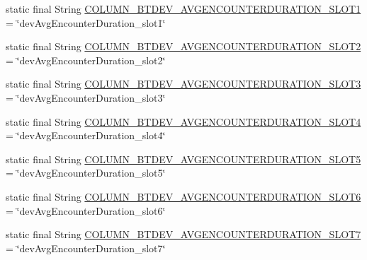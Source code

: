 \begin{DoxyCompactItemize}
\item 
static final String \hyperlink{classcom_1_1copelabs_1_1oiframework_1_1socialproximity_1_1_s_q_lite_helper_a1587f0eed87daf373cf8e595fa3061a0}{C\+O\+L\+U\+M\+N\+\_\+\+B\+T\+D\+E\+V\+\_\+\+A\+V\+G\+E\+N\+C\+O\+U\+N\+T\+E\+R\+D\+U\+R\+A\+T\+I\+O\+N\+\_\+\+S\+L\+O\+T1} = \char`\"{}dev\+Avg\+Encounter\+Duration\+\_\+slot1\char`\"{}
\item 
static final String \hyperlink{classcom_1_1copelabs_1_1oiframework_1_1socialproximity_1_1_s_q_lite_helper_aefeb1d706536288b9e0e606fe4ee6df1}{C\+O\+L\+U\+M\+N\+\_\+\+B\+T\+D\+E\+V\+\_\+\+A\+V\+G\+E\+N\+C\+O\+U\+N\+T\+E\+R\+D\+U\+R\+A\+T\+I\+O\+N\+\_\+\+S\+L\+O\+T2} = \char`\"{}dev\+Avg\+Encounter\+Duration\+\_\+slot2\char`\"{}
\item 
static final String \hyperlink{classcom_1_1copelabs_1_1oiframework_1_1socialproximity_1_1_s_q_lite_helper_a4f1f938f3722be2271d4593b1d8d3ac2}{C\+O\+L\+U\+M\+N\+\_\+\+B\+T\+D\+E\+V\+\_\+\+A\+V\+G\+E\+N\+C\+O\+U\+N\+T\+E\+R\+D\+U\+R\+A\+T\+I\+O\+N\+\_\+\+S\+L\+O\+T3} = \char`\"{}dev\+Avg\+Encounter\+Duration\+\_\+slot3\char`\"{}
\item 
static final String \hyperlink{classcom_1_1copelabs_1_1oiframework_1_1socialproximity_1_1_s_q_lite_helper_aa7f5e3c448045c6ea284cead8ada6280}{C\+O\+L\+U\+M\+N\+\_\+\+B\+T\+D\+E\+V\+\_\+\+A\+V\+G\+E\+N\+C\+O\+U\+N\+T\+E\+R\+D\+U\+R\+A\+T\+I\+O\+N\+\_\+\+S\+L\+O\+T4} = \char`\"{}dev\+Avg\+Encounter\+Duration\+\_\+slot4\char`\"{}
\item 
static final String \hyperlink{classcom_1_1copelabs_1_1oiframework_1_1socialproximity_1_1_s_q_lite_helper_a7d44e66e42425d636c452b9dbddec5db}{C\+O\+L\+U\+M\+N\+\_\+\+B\+T\+D\+E\+V\+\_\+\+A\+V\+G\+E\+N\+C\+O\+U\+N\+T\+E\+R\+D\+U\+R\+A\+T\+I\+O\+N\+\_\+\+S\+L\+O\+T5} = \char`\"{}dev\+Avg\+Encounter\+Duration\+\_\+slot5\char`\"{}
\item 
static final String \hyperlink{classcom_1_1copelabs_1_1oiframework_1_1socialproximity_1_1_s_q_lite_helper_a4c44d6f65c62d53bd276c79208d38348}{C\+O\+L\+U\+M\+N\+\_\+\+B\+T\+D\+E\+V\+\_\+\+A\+V\+G\+E\+N\+C\+O\+U\+N\+T\+E\+R\+D\+U\+R\+A\+T\+I\+O\+N\+\_\+\+S\+L\+O\+T6} = \char`\"{}dev\+Avg\+Encounter\+Duration\+\_\+slot6\char`\"{}
\item 
static final String \hyperlink{classcom_1_1copelabs_1_1oiframework_1_1socialproximity_1_1_s_q_lite_helper_ae6cfc9c5bc9e935cceaf7ca3e764b957}{C\+O\+L\+U\+M\+N\+\_\+\+B\+T\+D\+E\+V\+\_\+\+A\+V\+G\+E\+N\+C\+O\+U\+N\+T\+E\+R\+D\+U\+R\+A\+T\+I\+O\+N\+\_\+\+S\+L\+O\+T7} = \char`\"{}dev\+Avg\+Encounter\+Duration\+\_\+slot7\char`\"{}

\end{DoxyCompactItemize}
